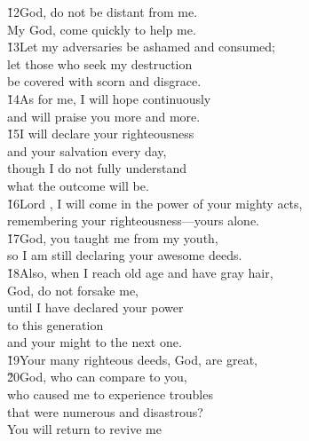 \begin{poetry}
\poeml \v{12}God, do not be distant from me. \\
\poemll    My God, come quickly to help me. \\
\poeml \v{13}Let my adversaries be ashamed and consumed; \\
\poemll    let those who seek my destruction \\
\poemlll       be covered with scorn and disgrace. \\
\poeml \v{14}As for me, I will hope continuously \\
\poemll    and will praise you more and more. \\
\poeml \v{15}I will declare your righteousness \\
\poemll    and your salvation every day, \\
\poeml though I do not fully understand \\
\poemll    what the outcome will be. \\
\poeml \v{16}Lord , I will come in the power of your mighty acts, \\
\poemll    remembering your righteousness---yours alone. \\
\poeml \v{17}God, you taught me from my youth, \\
\poemll    so I am still declaring your awesome deeds. \\
\poeml \v{18}Also, when I reach old age and have gray hair, \\
\poemll    God, do not forsake me, \\
\poeml until I have declared your power \\
\poemll    to this generation \\
\poemlll       and your might to the next one. \\
\poeml \v{19}Your many righteous deeds, God, are great, \\
\poeml \v{20}God, who can compare to you, \\
\poeml who caused me to experience troubles \\
\poeml that were numerous and disastrous? \\
\poeml You will return to revive me \\

\end{poetry}
